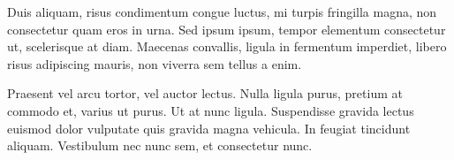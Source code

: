 \documentclass[12pt,a4paper]{report}
\begin{document}
Duis aliquam, risus condimentum congue luctus, mi turpis fringilla magna, non consectetur quam eros in urna. Sed ipsum ipsum, tempor elementum consectetur ut, scelerisque at diam. Maecenas convallis, ligula in fermentum imperdiet, libero risus adipiscing mauris, non viverra sem tellus a enim.

Praesent vel arcu tortor, vel auctor lectus. Nulla ligula purus, pretium at commodo et, varius ut purus. Ut at nunc ligula. Suspendisse gravida lectus euismod dolor vulputate quis gravida magna vehicula. In feugiat tincidunt aliquam. Vestibulum nec nunc sem, et consectetur nunc. 
\end{document}
